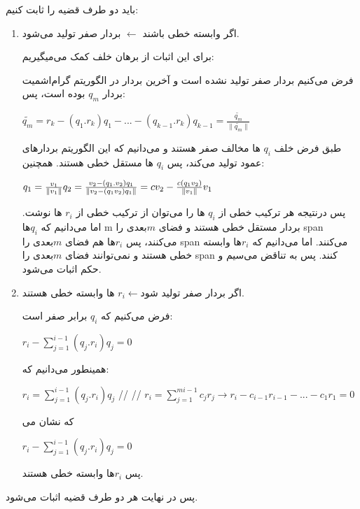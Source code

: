 باید دو طرف قضیه را ثابت کنیم:

\begin{enumerate}
	\item  	اگر وابسته خطی باشند $\longleftarrow$ بردار صفر تولید می‌شود. 
	
	برای این اثبات از برهان خلف کمک می‌میگیریم:
	
	فرض می‌کنیم بردار صفر تولید نشده است و آخرین بردار در الگوریتم گرام‌اشمیت بردار 
	$q_m$
	بوده است، پس:
	\setLTR
	
	$\widetilde{q_m} = r_k - (q_1.r_k)q_1 - ... - (q_{k-1}.r_k)q_{k-1}=\frac{\widetilde{q_m}}{\|\widetilde{q_m}\|}$
	
	\setRTL
	
	طبق فرض خلف
	$q_i$
	ها مخالف صفر هستند و می‌دانیم که این الگوریتم بردارهای عمود تولید می‌کند، پس 
	$q_i$
	ها مستقل‌ خطی هستند. همچنین:
	
	\setLTR
	
	$q_1 = \frac{v_1}{\|v_1\|} \\ q_2 = \frac{v_2 - (q_1.v_2)q_1}{\|v_2 - (q_1v_2)q_1\|} = cv_2 - \frac{c(q_1v_2)}{\|v_1\|}v_1$
	
	\setRTL
	
	پس درنتیجه هر ترکیب خطی از 
	$q_i$
	ها را می‌توان از ترکیب خطی از 
	$r_i$
	ها نوشت. اما می‌دانیم که $q_i$ها m بردار مستقل خطی هستند و فضای $m$بعدی را span می‌کنند، پس $r_i$ها هم فضای $m$بعدی را span می‌کنند.
	اما می‌دانیم که $r_i$ها وابسته خطی هستند و نمی‌توانند فضای $m$بعدی را span کنند. پس به تناقض می‌سیم و حکم اثبات می‌شود. \\
	
	
	
	\item 	اگر بردار صفر تولید شود$r_i \longleftarrow$ ها وابسته خطی هستند.
	
	فرض می‌کنیم که $q_i$ برابر صفر است:
	
	\setLTR
	
	$r_i - \sum_{j=1}^{i-1}(q_j.r_i)q_j = 0$
	
	\setRTL
	
	همینطور می‌دانیم که:
	
		\setLTR
	
	$r_i = \sum_{j=1}^{i-1}(q_j.r_i)q_j$ // //
	$r_i = \sum_{j=1}^{mi-1}c_jr_j \longrightarrow r_i - c_{i-1}r_{i-1} - ... - c_1r_1 = 0$
	\setRTL
	
	که نشان می	\setLTR
	
	$r_i - \sum_{j=1}^{i-1}(q_j.r_i)q_j = 0$
	
	\setRTL
	
	پس $r_i$ها وابسته خطی هستند.
	
	\end{enumerate}
	
	پس در نهایت هر دو طرف قضیه اثبات می‌شود.